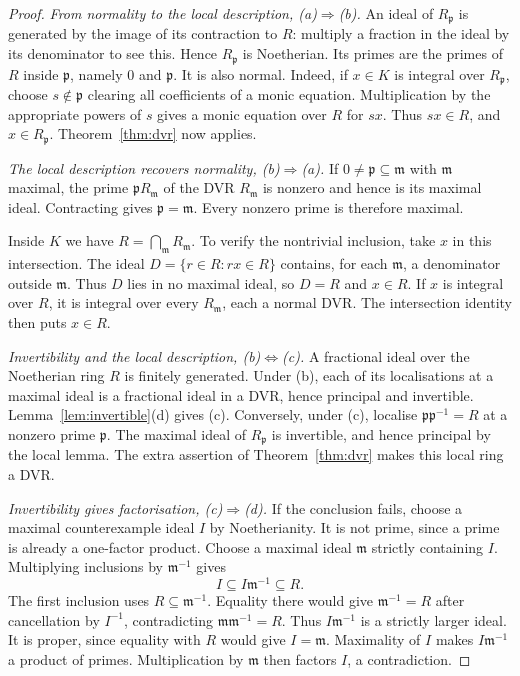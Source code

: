 \begin{proof}
\emph{From normality to the local description, (a)$\Rightarrow$(b).} An ideal of $R_{\mathfrak p}$ is generated by the image of its contraction to $R$: multiply a fraction in the ideal by its denominator to see this. Hence $R_{\mathfrak p}$ is Noetherian. Its primes are the primes of $R$ inside $\mathfrak p$, namely $0$ and $\mathfrak p$. It is also normal. Indeed, if $x\in K$ is integral over $R_{\mathfrak p}$, choose $s\notin\mathfrak p$ clearing all coefficients of a monic equation. Multiplication by the appropriate powers of $s$ gives a monic equation over $R$ for $sx$. Thus $sx\in R$, and $x\in R_{\mathfrak p}$. Theorem~\ref{thm:dvr} now applies.

\emph{The local description recovers normality, (b)$\Rightarrow$(a).} If $0\ne\mathfrak p\subseteq\mathfrak m$ with $\mathfrak m$ maximal, the prime $\mathfrak pR_{\mathfrak m}$ of the DVR $R_{\mathfrak m}$ is nonzero and hence is its maximal ideal. Contracting gives $\mathfrak p=\mathfrak m$. Every nonzero prime is therefore maximal.

Inside $K$ we have $R=\bigcap_{\mathfrak m}R_{\mathfrak m}$. To verify the nontrivial inclusion, take $x$ in this intersection. The ideal $D=\{r\in R:rx\in R\}$ contains, for each $\mathfrak m$, a denominator outside $\mathfrak m$. Thus $D$ lies in no maximal ideal, so $D=R$ and $x\in R$. If $x$ is integral over $R$, it is integral over every $R_{\mathfrak m}$, each a normal DVR. The intersection identity then puts $x\in R$.

\emph{Invertibility and the local description, (b)$\Leftrightarrow$(c).} A fractional ideal over the Noetherian ring $R$ is finitely generated. Under (b), each of its localisations at a maximal ideal is a fractional ideal in a DVR, hence principal and invertible. Lemma~\ref{lem:invertible}(d) gives (c). Conversely, under (c), localise $\mathfrak p\mathfrak p^{-1}=R$ at a nonzero prime $\mathfrak p$. The maximal ideal of $R_{\mathfrak p}$ is invertible, and hence principal by the local lemma. The extra assertion of Theorem~\ref{thm:dvr} makes this local ring a DVR.

\emph{Invertibility gives factorisation, (c)$\Rightarrow$(d).} If the conclusion fails, choose a maximal counterexample ideal $I$ by Noetherianity. It is not prime, since a prime is already a one-factor product. Choose a maximal ideal $\mathfrak m$ strictly containing $I$. Multiplying inclusions by $\mathfrak m^{-1}$ gives
\[
 I\subseteq I\mathfrak m^{-1}\subseteq R.
\]
The first inclusion uses $R\subseteq\mathfrak m^{-1}$. Equality there would give $\mathfrak m^{-1}=R$ after cancellation by $I^{-1}$, contradicting $\mathfrak m\mathfrak m^{-1}=R$. Thus $I\mathfrak m^{-1}$ is a strictly larger ideal. It is proper, since equality with $R$ would give $I=\mathfrak m$. Maximality of $I$ makes $I\mathfrak m^{-1}$ a product of primes. Multiplication by $\mathfrak m$ then factors $I$, a contradiction.


\end{proof}
